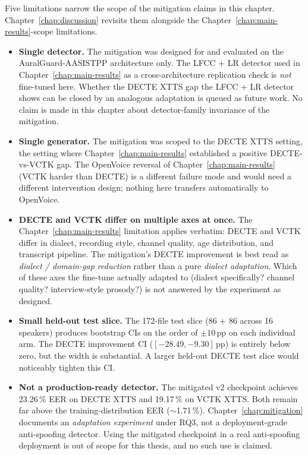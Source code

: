 Five limitations narrow the scope of the mitigation claims in
this chapter. Chapter~\ref{chap:discussion} revisits them alongside the
Chapter~\ref{chap:main-results}-scope limitations.

\begin{itemize}
    \item \textbf{Single detector.} The mitigation was designed for and
        evaluated on the AuralGuard-AASISTPP architecture only. The
        LFCC + LR detector used in Chapter~\ref{chap:main-results} as a cross-architecture
        replication check is \emph{not} fine-tuned here. Whether the
        DECTE XTTS gap the LFCC + LR detector shows can be closed by
        an analogous adaptation is queued as future work. No claim
        is made in this chapter about detector-family invariance of
        the mitigation.
    \item \textbf{Single generator.} The mitigation was scoped to the DECTE
        XTTS setting, the setting where Chapter~\ref{chap:main-results} established a
        positive DECTE-vs-VCTK gap. The OpenVoice reversal of
        Chapter~\ref{chap:main-results} (VCTK harder than DECTE) is a different failure
        mode and would need a different intervention design; nothing
        here transfers automatically to OpenVoice.
    \item \textbf{DECTE and VCTK differ on multiple axes at once.} The
        Chapter~\ref{chap:main-results} limitation applies verbatim: DECTE and VCTK
        differ in dialect, recording style, channel quality, age
        distribution, and transcript pipeline. The mitigation's
        DECTE improvement is best read as \emph{dialect / domain-gap
        reduction} rather than a pure \emph{dialect adaptation}. Which
        of these axes the fine-tune actually adapted to (dialect
        specifically? channel quality? interview-style prosody?) is
        not answered by the experiment as designed.
    \item \textbf{Small held-out test slice.} The 172-file test slice
        (86 + 86 across 16 speakers) produces bootstrap CIs on the
        order of $\pm 10$\,pp on each individual arm. The DECTE
        improvement CI ($[-28.49, -9.30]$\,pp) is entirely below zero,
        but the width is substantial. A larger held-out DECTE test
        slice would noticeably tighten this CI.
    \item \textbf{Not a production-ready detector.} The mitigated v2
        checkpoint achieves 23.26\,\% EER on DECTE XTTS and 19.17\,\%
        on VCTK XTTS. Both remain far above the training-distribution
        EER ($\sim$1.71\,\%). Chapter~\ref{chap:mitigation} documents an \emph{adaptation experiment}
        under RQ3, not a deployment-grade anti-spoofing detector.
        Using the mitigated checkpoint in a real anti-spoofing
        deployment is out of scope for this thesis, and no such use
        is claimed.
\end{itemize}

